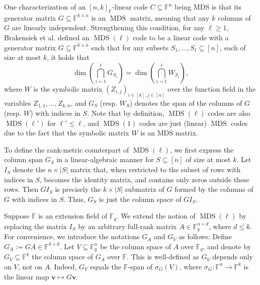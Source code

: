 \documentclass[11pt]{article}
\theoremstyle{plain}
\theoremstyle{definition}
\theoremstyle{remark}
\newcommand{\F}{\mathbb{F}}
\newcommand{\bv}{\bm{v}}
\begin{document}
One characterization of an $[n,k]_{\F}$-linear code $C\subseteq\F^n$ being MDS is that its generator matrix $G\subseteq\F^{k\times n}$ is an $\operatorname{MDS}$ matrix, meaning that any $k$ columns of $G$ are linearly independent.
Strengthening this condition, for any $\ell\geq 1$, Brakensiek et al. \cite{brakensiek2023generic} defined an $\operatorname{MDS}(\ell)$ code to be a linear code with a generator matrix $G\subseteq\F^{k\times n}$ such that for any subsets $S_1,\dots,S_{\ell}\subseteq [n]$, each of size at most $k$, it holds that
\begin{equation}\label{eq:mds-ell-condition}
\dim\left(\bigcap_{i=1}^\ell G_{S_i}\right)=\dim \left(\bigcap_{i=1}^\ell W_{S_i}\right),
\end{equation}
where $W$ is the symbolic matrix $\left(Z_{i,j}\right)_{i\in [k], j\in [n]}$ over the function field in the variables $Z_{1,1},\dots,Z_{k,n}$, and $G_S$ (resp. $W_S$) denotes the span of the columns of $G$ (resp. $W$) with indices in $S$.
Note that by definition, $\operatorname{MDS}(\ell)$ codes are also $\operatorname{MDS}(\ell')$ for $\ell'\leq \ell$, and $\operatorname{MDS}(1)$ codes are just (linear) $\operatorname{MDS}$ codes due to the fact that the symbolic matrix $W$ is an MDS matrix.

To define the rank-metric counterpart of $\operatorname{MDS}(\ell)$, we first express the column span $G_S$ in a linear-algebraic manner for $S\subseteq [n]$ of size at most $k$.
Let $I_S$ denote the $n\times |S|$ matrix that, when restricted to the subset of rows with indices in $S$, becomes the identity matrix, and contains only zeros outside these rows. Then $G I_S$ is precisely the $k\times |S|$ submatrix of $G$ formed by the columns of $G$ with indices in $S$. Thus, $G_S$ is just the column space of $G I_S$.

Suppose $\F$ is an extension field of $\F_q$.
We extend the notion of $\operatorname{MDS}(\ell)$ by replacing the matrix $I_S$ by an arbitrary full-rank matrix $A\in \F_q^{n\times d}$, where $d\leq k$.
For convenience, we introduce the notations $G_A$ and $G_V$ as follows:
Define $G_A:=G A\in\F^{k\times d}$.
Let $V\subseteq\F_q^n$ be the column space of $A$ over $\F_q$, and denote by $G_V\subseteq \F^{k}$ the column space of $G_A$ over $\F$. 
This is well-defined as $G_V$ depends only on $V$, not on $A$. Indeed, $G_V$ equals the $\F$-span of $\sigma_G(V)$, where $\sigma_G: \F^n\to\F^k$ is the linear map $\bv\mapsto G\bv$.
\end{document}
